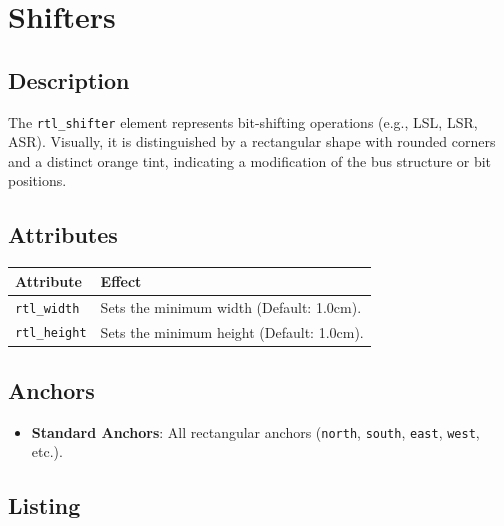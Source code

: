 \section{\sffamily Shifters}

    \subsection{\sffamily Description}
        The \texttt{rtl\_shifter} element represents bit-shifting operations (e.g., LSL, LSR, ASR). Visually, it is distinguished by a rectangular shape with rounded corners and a distinct orange tint, indicating a modification of the bus structure or bit positions.

    \subsection{\sffamily Attributes}
    \begin{center}
        \begin{tabular}{lp{8cm}}
        \toprule
            \textbf{Attribute} & \textbf{Effect} \\
            \midrule
            \texttt{rtl\_width} & Sets the minimum width (Default: 1.0cm). \\
            \texttt{rtl\_height} & Sets the minimum height (Default: 1.0cm). \\
            \bottomrule
        \end{tabular}
    \end{center}

    \subsection{\sffamily Anchors}
        \begin{itemize}
            \item \textbf{Standard Anchors}: All rectangular anchors (\texttt{north}, \texttt{south}, \texttt{east}, \texttt{west}, etc.).
        \end{itemize}

    \subsection{\sffamily Listing}
\begin{RTLexample}
\end{RTLexample}

